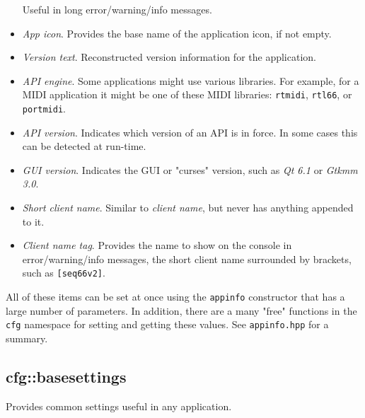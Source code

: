 \begin{itemize}
         Useful in long error/warning/info messages.
      \item \textsl{App icon}.
         Provides the base name of the application icon, if not empty.
      \item \textsl{Version text}.
         Reconstructed version information for the application.
      \item \textsl{API engine}.
         Some applications might use various libraries.
         For example, for a MIDI application it might be one of these
         MIDI libraries:
         \texttt{rtmidi},
         \texttt{rtl66},
         or \texttt{portmidi}.
      \item \textsl{API version}.
         Indicates which version of an API is in force.
         In some cases this can be detected at run-time.
      \item \textsl{GUI version}.
         Indicates the GUI or "curses" version, such as \textsl{Qt 6.1}
         or \textsl{Gtkmm 3.0}.
      \item \textsl{Short client name}.
         Similar to \textsl{client name}, but never has anything appended
         to it.
      \item \textsl{Client name tag}.
         Provides the name to show on the console in error/warning/info messages,
         the short client name surrounded by brackets, such as
         \texttt{[seq66v2]}.
   \end{itemize}

   All of these items can be set at once using the \texttt{appinfo}
   constructor that has a large number of parameters.
   In addition, there are a many "free" functions in the \texttt{cfg}
   namespace for setting and getting these values.
   See \texttt{appinfo.hpp} for a summary.

\subsection{cfg::basesettings}
\label{subsec:cfg_namespace_basesettings}

   Provides common settings useful in any application.

